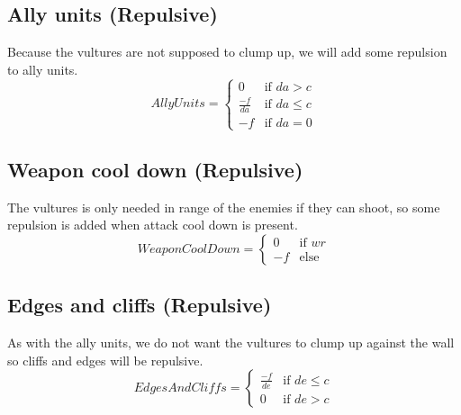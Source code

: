 	\subsection*{Ally units (Repulsive)}
		Because the vultures are not supposed to clump up, we will add some repulsion to ally units.
		\begin{displaymath}
			AllyUnits = \begin{cases}
					0 & \text{if } da > c\\
					\frac{-f}{da} & \text{if } da \leq c\\
					-f & \text{if } da = 0
				\end{cases}		
		\end{displaymath}
	\subsection*{Weapon cool down (Repulsive)}
		The vultures is only needed in range of the enemies if they can shoot, so some repulsion is added when attack cool down is present.
		\begin{displaymath}
			WeaponCoolDown = \begin{cases}
					0 & \text{if } wr\\
					-f & \text{else}
				\end{cases}		
		\end{displaymath}
	\subsection*{Edges and cliffs (Repulsive)}
		As with the ally units, we do not want the vultures to clump up against the wall so cliffs and edges will be repulsive.
		\begin{displaymath}
			EdgesAndCliffs = \begin{cases}
					\frac{-f}{de} & \text{if } de \leq c\\
					0 & \text{if } de > c
				\end{cases}		
		\end{displaymath}
	
	